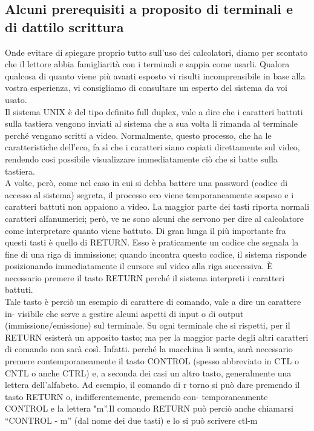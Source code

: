 \subsection{ Alcuni prerequisiti a proposito di terminali e di dattilo scrittura}
Onde evitare di spiegare proprio tutto sull'uso dei calcolatori, diamo per scontato che
il lettore abbia famigliarità con i terminali e sappia come usarli. Qualora qualcosa di
quanto viene più avanti esposto vi risulti incomprensibile in base alla vostra esperienza,
vi consigliamo di consultare un esperto del sistema da voi usato.\\
Il sistema UNIX è del tipo definito full duplex, vale a dire che i caratteri battuti sulla
tastiera vengono inviati al sistema che a sua volta li rimanda al terminale perché
vengano scritti a video. Normalmente, questo processo, che ha le caratteristiche
dell'eco, fa sì che i caratteri siano copiati direttamente sul video, rendendo cosi possibile
visualizzare immediatamente ciò che si batte sulla tastiera.\\
A volte, però, come nel caso in cui si debba battere una password (codice di accesso
al sistema) segreta, il processo eco viene temporaneamente sospeso e i caratteri
battuti non appaiono a video. La maggior parte dei tasti riporta normali caratteri alfanumerici;
però, ve ne sono alcuni che servono per dire al calcolatore come interpretare
quanto viene battuto. Di gran lunga il più importante fra questi tasti è quello di
RETURN. Esso è praticamente un codice che segnala la fine di una riga di immissione;
quando incontra questo codice, il sistema risponde posizionando immediatamente
il cursore sul video alla riga successiva. È necessario premere il tasto RETURN perché
il sistema interpreti i caratteri battuti.\\
Tale tasto è perciò un esempio di carattere di comando, vale a dire un carattere in-
visibile che serve a gestire alcuni aspetti di input o di output (immissione/emissione)
sul terminale. Su ogni terminale che si rispetti, per il RETURN esisterà un apposito
tasto; ma per la maggior parte degli altri caratteri di comando non sarà così. Infatti.
perché la macchina li senta, sarà necessario premere contemporaneamente il tasto
CONTROL (spesso abbreviato in CTL o CNTL o anche CTRL) e, a seconda dei casi
un altro tasto, generalmente una lettera dell'alfabeto. Ad esempio, il comando di r
torno si può dare premendo il tasto RETURN o, indifferentemente, premendo con-
temporaneamente CONTROL e la lettera "m''.Il comando RETURN può perciò
anche chiamarsi ``CONTROL - m'' (dal nome dei due tasti) e lo si può scrivere ctl-m
